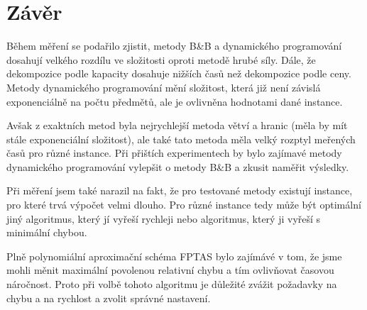 \documentclass[11pt]{article}
\begin{document}
\section{Závěr}
Během měření se podařilo zjistit, metody B\&B a dynamického programování dosahují velkého rozdílu ve složitosti oproti metodě hrubé síly. Dále, že dekompozice podle kapacity dosahuje nižších časů než dekompozice podle ceny. Metody dynamického programování mění složitost, která již není závislá exponenciálně na počtu předmětů, ale je ovlivněna hodnotami dané instance.

 Avšak z exaktních metod byla nejrychlejší metoda větví a hranic (měla by mít stále exponenciální složitost), ale také tato metoda měla velký rozptyl meřených časů pro různé instance. Při přištích experimentech by bylo zajímavé metody dynamického programování vylepšit o metody B\&B a zkusit naměřit výsledky.

Při měření jsem také narazil na fakt, že pro testované metody existují instance, pro které trvá výpočet velmi dlouho. Pro různé instance tedy může být optimální jiný algoritmus, který jí vyřeší rychleji nebo algoritmus, který ji vyřeší s minimální chybou.

Plně polynomiální aproximační schéma FPTAS bylo zajímávé v tom, že jsme mohli měnit maximální povolenou relativní chybu a tím ovlivňovat časovou náročnost. Proto při volbě tohoto algoritmu je důležité zvážit požadavky na chybu a na rychlost a zvolit správné nastavení.
\end{document}
